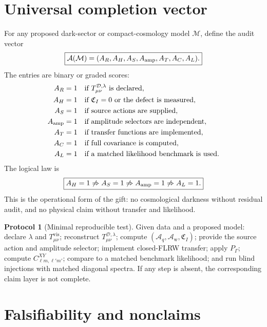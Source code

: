 \documentclass[
  aps,
  prd,
  reprint,
  superscriptaddress,
  floatfix,
  nofootinbib,
  longbibliography
]{revtex4-2}
\theoremstyle{plain}
\theoremstyle{definition}
\newtheorem{protocol}[theorem]{Protocol}
\theoremstyle{remark}
\newcommand{\D}{\mathcal D}
\newcommand{\vis}{\mathrm{vis}}
\newcommand{\Aq}{\mathcal A_q}
\newcommand{\Aw}{\mathcal A_{\mathrm w}}
\newcommand{\PG}{P_{\Gamma}}
\newcommand{\Mcal}{\mathcal M}
\newcommand{\Acal}{\mathcal A}
\begin{document}
\section{Universal completion vector}

For any proposed dark-sector or compact-cosmology model \(\Mcal\), define the audit vector
\begin{equation}
\boxed{
\Acal(\Mcal)=(A_R,A_H,A_S,A_{\rm amp},A_T,A_C,A_L).
}
\label{eq:audit_vector}
\end{equation}
The entries are binary or graded scores:
\begin{align}
A_R&=1 &&\text{if }T^{\D,\lambda}_{\mu\nu}\text{ is declared},\nonumber\\
A_H&=1 &&\text{if }\mathfrak C_I=0\text{ or the defect is measured},\nonumber\\
A_S&=1 &&\text{if source actions are supplied},\nonumber\\
A_{\rm amp}&=1 &&\text{if amplitude selectors are independent},\nonumber\\
A_T&=1 &&\text{if transfer functions are implemented},\nonumber\\
A_C&=1 &&\text{if full covariance is computed},\nonumber\\
A_L&=1 &&\text{if a matched likelihood benchmark is used}.
\end{align}
The logical law is
\begin{equation}
\boxed{
A_H=1\not\Rightarrow A_S=1\not\Rightarrow A_{\rm amp}=1\not\Rightarrow A_L=1.
}
\label{eq:audit_nonimplication}
\end{equation}
This is the operational form of the gift: no cosmological darkness without residual audit, and no physical claim without transfer and likelihood.

\begin{protocol}[Minimal reproducible test]
Given data and a proposed model: declare \(\lambda\) and \(T^{\vis}_{\mu\nu}\); reconstruct \(T^{\D,\lambda}_{\mu\nu}\); compute \((\Aq,\Aw,\mathfrak C_I)\); provide the source action and amplitude selector; implement closed-FLRW transfer; apply \(\PG\); compute \(C^{XY}_{\ell m,\ell'm'}\); compare to a matched benchmark likelihood; and run blind injections with matched diagonal spectra.  If any step is absent, the corresponding claim layer is not complete.
\end{protocol}

\section{Falsifiability and nonclaims}
\end{document}
